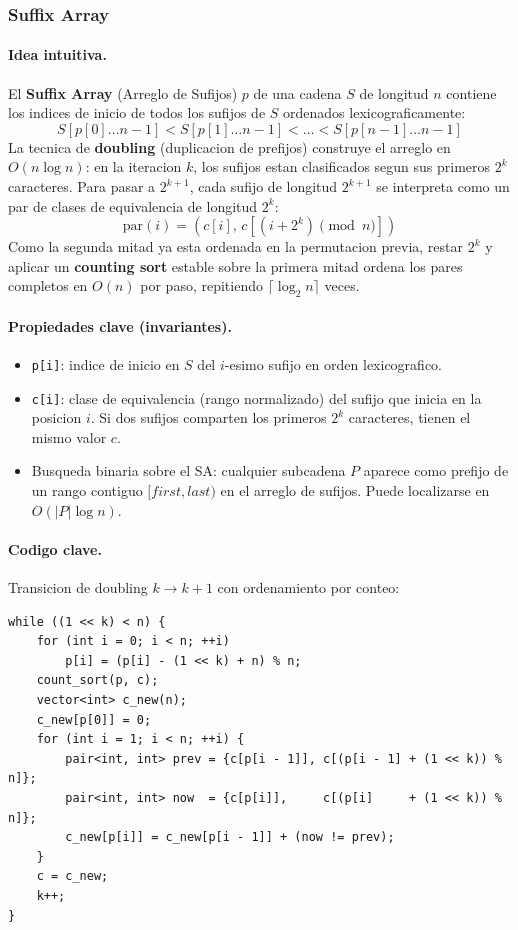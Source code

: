 \subsubsection{Suffix Array}

\paragraph{Idea intuitiva.}
El \textbf{Suffix Array} (Arreglo de Sufijos) $p$ de una cadena $S$ de longitud $n$ contiene los indices de inicio de todos los sufijos de $S$ ordenados lexicograficamente:
\[
S[p[0] \dots n-1] < S[p[1] \dots n-1] < \dots < S[p[n-1] \dots n-1]
\]
La tecnica de \textbf{doubling} (duplicacion de prefijos) construye el arreglo en $O(n \log n)$: en la iteracion $k$, los sufijos estan clasificados segun sus primeros $2^k$ caracteres. Para pasar a $2^{k+1}$, cada sufijo de longitud $2^{k+1}$ se interpreta como un par de clases de equivalencia de longitud $2^k$:
\[
\text{par}(i) = \left( c[i], \, c[(i + 2^k) \pmod n] \right)
\]
Como la segunda mitad ya esta ordenada en la permutacion previa, restar $2^k$ y aplicar un \textbf{counting sort} estable sobre la primera mitad ordena los pares completos en $O(n)$ por paso, repitiendo $\lceil \log_2 n \rceil$ veces.

\paragraph{Propiedades clave (invariantes).}
\begin{itemize}\setlength\itemsep{0pt}
	\item \texttt{p[i]}: indice de inicio en $S$ del $i$-esimo sufijo en orden lexicografico.
	\item \texttt{c[i]}: clase de equivalencia (rango normalizado) del sufijo que inicia en la posicion $i$. Si dos sufijos comparten los primeros $2^k$ caracteres, tienen el mismo valor $c$.
	\item Busqueda binaria sobre el SA: cualquier subcadena $P$ aparece como prefijo de un rango contiguo $[first, last)$ en el arreglo de sufijos. Puede localizarse en $O(|P| \log n)$.
\end{itemize}

\paragraph{Codigo clave.}
Transicion de doubling $k \to k+1$ con ordenamiento por conteo:
\begin{verbatim}
while ((1 << k) < n) {
    for (int i = 0; i < n; ++i)
        p[i] = (p[i] - (1 << k) + n) % n;
    count_sort(p, c);
    vector<int> c_new(n);
    c_new[p[0]] = 0;
    for (int i = 1; i < n; ++i) {
        pair<int, int> prev = {c[p[i - 1]], c[(p[i - 1] + (1 << k)) % n]};
        pair<int, int> now  = {c[p[i]],     c[(p[i]     + (1 << k)) % n]};
        c_new[p[i]] = c_new[p[i - 1]] + (now != prev);
    }
    c = c_new;
    k++;
}
\end{verbatim}


